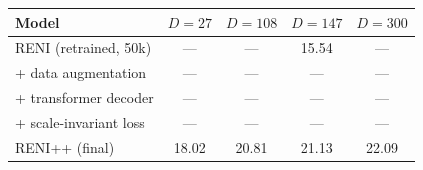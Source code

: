 \begin{tabular}{| l | c | c | c | c | }
\hline
Model & $D=27$ & $D=108$ & $D=147$ & $D=300$ \\
\hline
RENI (retrained, 50k) & --- & --- & 15.54 & --- \\
+ data augmentation & --- & --- & --- & --- \\
+ transformer decoder & --- & --- & --- & --- \\
+ scale-invariant loss & --- & --- & --- & --- \\
RENI++ (final) & 18.02 & 20.81 & 21.13 & 22.09 \\
\hline
\end{tabular}
